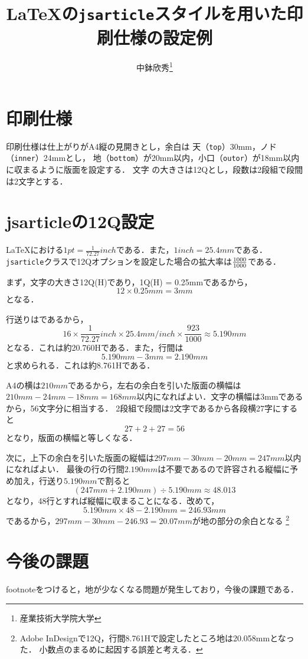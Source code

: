 \documentclass[a4j, 12Q, twocolumn, twoside]{jsarticle}
\title{\LaTeX の\texttt{jsarticle}スタイルを用いた印刷仕様の設定例}
\author{中鉢欣秀\thanks{産業技術大学院大学}}
\begin{document}
\maketitle
\section{印刷仕様}

  印刷仕様は仕上がりがA4縦の見開きとし，余白は
  天（\texttt{top}）30mm，ノド（\texttt{inner}）24mmとし，
  地（\texttt{bottom}）が20mm以内，小口（\texttt{outor}）が18mm以内に収まるように版面を設定する．
  文字
  の大きさは12Qとし，段数は2段組で段間は2文字とする．

\section{jsarticleの12Q設定}
  \LaTeX における$1 pt = \frac{1}{72.27} inch$である．また，$1 inch = 25.4 mm$である．
  \texttt{jsarticle}クラスで12Qオプションを設定した場合の拡大率は$\frac{\the\mag}{1000}$である．

  まず，文字の大きさ12Q(H)であり，1Q(H) = 0.25mmであるから，
  \[ 12 \times 0.25 mm = 3 mm \]
  となる．

  行送りは\the\baselineskip であるから，
　　\[ 16 \times \frac{1}{72.27} inch \times 25.4 mm/inch \times \frac{923}{1000} \approx 5.190 mm \]
  となる．これは約20.760Hである．また，行間は
  \[ 5.190 mm - 3 mm = 2.190 mm \]
  と求められる．これは約8.761Hである．
  
  A4の横は$210mm$であるから，左右の余白を引いた版面の横幅は
  $210mm - 24mm - 18mm = 168mm$以内になればよい．文字の横幅は3mmであるから，56文字分に相当する．
  2段組で段間は2文字であるから各段横27字にすると\[ 27 + 2 + 27 = 56 \]となり，版面の横幅と等しくなる．
  
  次に，上下の余白を引いた版面の縦幅は$297mm - 30mm - 20mm = 247mm$以内になればよい．
  最後の行の行間$2.190mm$は不要であるので許容される縦幅に予め加え，行送り$5.190mm$で割ると
  \[ (247mm + 2.190mm) \div 5.190mm \approx 48.013 \]
  となり，48行とすれば縦幅に収まることになる．改めて，
  \[ 5.190mm \times 48 - 2.190mm = 246.93mm \]
  であるから，$297mm -30mm - 246.93 = 20.07mm$が地の部分の余白となる
  \footnote{Adobe InDesignで12Q，行間8.761Hで設定したところ地は20.058mmとなった．
  小数点のまるめに起因する誤差と考える．}
\section{今後の課題}
  footnoteをつけると，地が少なくなる問題が発生しており，今後の課題である．
  
\end{document}
